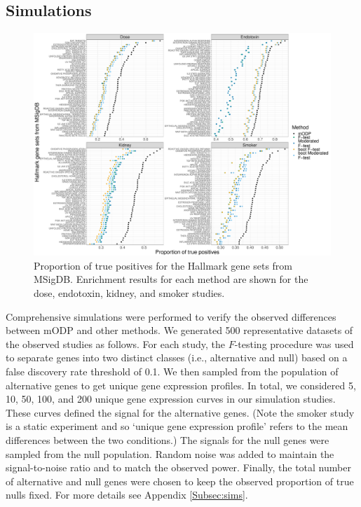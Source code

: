 \documentclass[11pt]{article}
\begin{document}
\subsection{Simulations}
\begin{figure}[!t]
\centering
\includegraphics[width = \textwidth]{../analysis/figures/gsea.pdf}  
\caption{Proportion of true positives for the Hallmark gene sets from MSigDB. Enrichment results for each method are shown for the dose, endotoxin, kidney, and smoker studies.}
\label{fig:gsea}
\end{figure}

Comprehensive simulations were performed to verify the observed differences between mODP and other methods. We generated 500 representative datasets of the observed studies as follows. For each study, the $F$-testing procedure was used to separate genes into two distinct classes (i.e., alternative and null) based on a false discovery rate threshold of 0.1. We then sampled from the population of alternative genes to get unique gene expression profiles. In total, we considered 5, 10, 50, 100, and 200 unique gene expression curves in our simulation studies. These curves defined the signal for the alternative genes. (Note the smoker study is a static experiment and so `unique gene expression profile' refers to the mean differences between the two conditions.) The signals for the null genes were sampled from the null population. Random noise was added to maintain the signal-to-noise ratio and to match the observed power. Finally, the total number of alternative and null genes were chosen to keep the observed proportion of true nulls fixed. For more details see Appendix \ref{Subsec:sims}.
\end{document}
